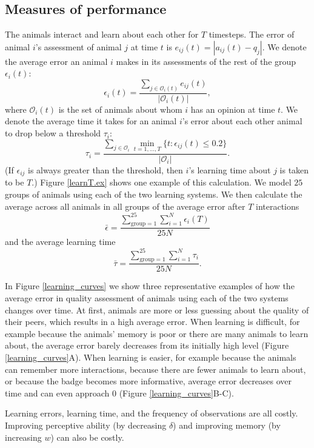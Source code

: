 \subsection{Measures of performance }
The animals interact and learn about each other for $T$ timesteps. The error of animal $i$'s assessment of animal $j$ at time $t$ is $e_{ij}(t)=|a_{ij}(t)-q_j|$. We denote the average error an animal $i$ makes in its assessments of the rest of the group $\epsilon_i(t)$: 
\begin{equation*}
\epsilon_i(t) = \frac{\sum_{j\in \mathscr{O}_i(t)}e_{ij}(t)}{|\mathscr{O}_i(t)|},
\end{equation*}
where $\mathscr{O}_i(t)$ is the set of animals about whom $i$ has an opinion at time $t$.  
We denote the average time it takes for an animal $i$'s error about each other animal to drop below a threshold $\tau_i$:
\begin{equation*}
\tau_{i} = \frac{\sum_{j\in\mathscr{O}_i} \min_{t=1,\dots,T}\{t: \epsilon_{ij}(t)\leq 0.2 \}}{|\mathscr{O}_i|} .
\end{equation*}
(If $\epsilon_{ij}$ is always greater than the threshold, then $i$'s learning time about $j$ is taken to be $T$.) Figure \ref{learnT.ex} shows one example of this calculation. We model $25$ groups of animals using each of the two learning systems. We then calculate the average across all animals in all groups  of the average error after $T$ interactions 
$$\bar{\epsilon}=\frac{\sum_{\text{group}=1}^{25}\sum_{i=1}^N\epsilon_i(T)}{25N}$$ and the average learning time $$\bar{\tau}=\frac{\sum_{\text{group}=1}^{25}\sum_{i=1}^N\tau_i}{25N}.$$

In Figure \ref{learning_curves} we show three representative examples of how the average error in quality assessment of animals using each of the two systems changes over time. At first, animals are more or less guessing about the quality of their peers, which results in a high average error. When learning is difficult, for example because the animals' memory is poor or there are many animals to learn about, the average error barely decreases from its initially high level (Figure \ref{learning_curves}A). When learning is easier, for example because the animals can remember more interactions, because there are fewer animals to learn about, or because the badge becomes more informative, average error decreases over time and can even approach $0$ (Figure \ref{learning_curves}B-C).  

Learning errors, learning time, and the frequency of observations are all costly. 
Improving  perceptive ability (by decreasing $\delta$) and improving memory (by increasing $w$) can also be costly. 

